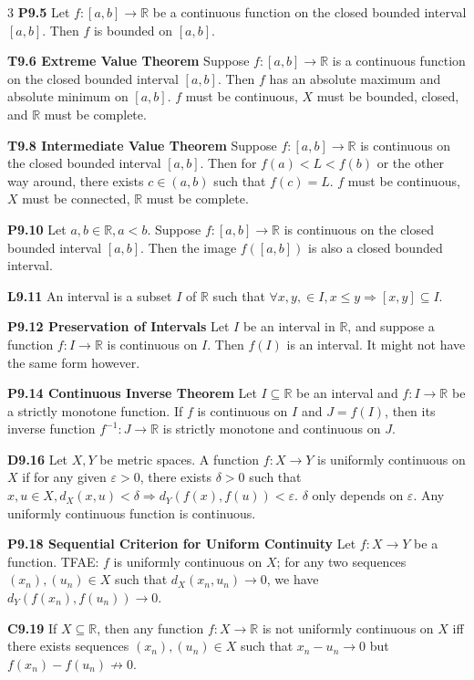 \documentclass[10pt, landscape]{article}
\begin{document}
\begin{multicols*}{3}
\textbf{P9.5} Let $f:[a,b]\rightarrow\mathbb{R}$ be a continuous function on the closed bounded interval $[a,b]$. Then $f$ is bounded on $[a,b]$.

\textbf{T9.6 Extreme Value Theorem} Suppose $f:[a,b]\rightarrow\mathbb{R}$ is a continuous function on the closed bounded interval $[a,b]$. Then $f$ has an absolute maximum and absolute minimum on $[a,b]$. $f$ must be continuous, $X$ must be bounded, closed, and $\mathbb{R}$ must be complete.

\textbf{T9.8 Intermediate Value Theorem} Suppose $f:[a,b]\rightarrow\mathbb{R}$ is continuous on the closed bounded interval $[a, b]$. Then for $f(a) < L < f(b)$ or the other way around, there exists $c \in (a, b)$ such that $f(c)=L$. $f$ must be continuous, $X$ must be connected, $\mathbb{R}$ must be complete.

\textbf{P9.10} Let $a, b \in \mathbb{R}, a<b$. Suppose $f:[a,b]\rightarrow\mathbb{R}$ is continuous on the closed bounded interval $[a,b]$. Then the image $f([a,b])$ is also a closed bounded interval.

\textbf{L9.11} An interval is a subset $I$ of $\mathbb{R}$ such that $\forall x, y, \in I, x \leq y \Rightarrow [x,y] \subseteq I$.

\textbf{P9.12 Preservation of Intervals} Let $I$ be an interval in $\mathbb{R}$, and suppose a function $f:I \rightarrow \mathbb{R}$ is continuous on $I$. Then $f(I)$ is an interval. It might not have the same form however.

\textbf{P9.14 Continuous Inverse Theorem} Let $I\subseteq \mathbb{R}$ be an interval and $f:I \rightarrow \mathbb{R}$ be a strictly monotone function. If $f$ is continuous on $I$ and $J=f(I)$, then its inverse function $f^{-1}:J \rightarrow \mathbb{R}$ is strictly monotone and continuous on $J$.

\textbf{D9.16} Let $X, Y$ be metric spaces. A function $f:X \rightarrow Y$ is uniformly continuous on $X$ if for any given $\varepsilon>0$, there exists $\delta > 0$ such that $x, u \in X, d_X(x, u) < \delta \Rightarrow d_Y(f(x), f(u)) < \varepsilon$. $\delta$ only depends on $\varepsilon$. Any uniformly continuous function is continuous.

\textbf{P9.18 Sequential Criterion for Uniform Continuity} Let $f:X \rightarrow Y$ be a function. TFAE: $f$ is uniformly continuous on $X$; for any two sequences $(x_n), (u_n) \in X$ such that $d_X(x_n, u_n) \rightarrow 0$, we have $d_Y(f(x_n), f(u_n))\rightarrow 0$.

\textbf{C9.19} If $X\subseteq \mathbb{R}$, then any function $f:X \rightarrow \mathbb{R}$ is not uniformly continuous on $X$ iff there exists sequences $(x_n), (u_n) \in X$ such that $x_n-u_n \rightarrow 0$ but $f(x_n)-f(u_n) \not\rightarrow 0$.


\end{multicols*}
\end{document}
